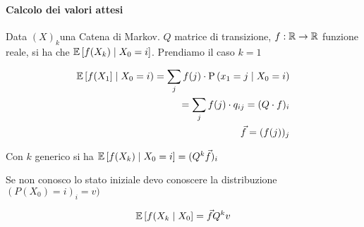 \paragraph{Calcolo dei valori attesi}

Data $ (X)_k $una Catena di Markov. $ Q $ matrice di transizione, $ f : \mathbb{R} \to \mathbb{R}$ funzione reale, si ha che $ \mathbb{E}\left[f(X_k) \mid X_0 = i\right] $. Prendiamo il caso $ k = 1 $

\begin{equation*}
	\begin{aligned}
	\mathbb{E}\left[f(X_1\right] \mid X_0 = i) = \sum_j f(j) \cdot \text{P}\left(x_1 = j \mid X_0 = i\right) \\
	= \sum_j f(j) \cdot q_{ij} = (Q \cdot f)_i \\
	\vec{f} = (f(j))_j
	\end{aligned}
\end{equation*}

Con $ k $ generico si ha $\mathbb{E}\left[f(X_k) \mid X_0 = i\right] = (Q^k \vec{f})_i $

Se non conosco lo stato iniziale devo conoscere la distribuzione $ (P(X_0) =i)_i = v) $

\begin{equation*}
\mathbb{E}\left[f(X_k \mid X_0\right] = \vec{f} Q^k v
\end{equation*}

%	
%	
%	




